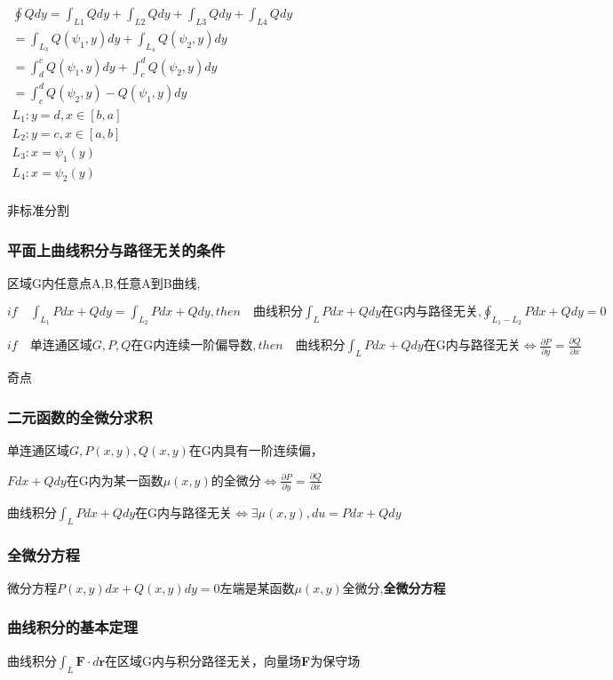 \documentclass[UTF8]{ctexart}
\newcommand{\mt}[1]{\text{#1}}
\newcommand{\mb}[1]{\textbf{#1}}
\newcommand{\mf}[1]{\left( #1\right)}
\newcommand{\mfc}[1]{\left[ #1 \right]}
\newcommand{\q}{\quad}
\newcommand{\p}{\par}
\newcommand{\ma}[1]{\begin{array}{llll} #1 \end{array}}
\newcommand{\da}[2]{\frac{\partial #1}{\partial #2}}
\begin{document}
$\ma{\oint Qdy=\int_{L1}Qdy+\int_{L2}Qdy+\int_{L3}Qdy+\int_{L4}Qdy\\
    =\int_{L_3}Q\mf{\psi_1,y}dy+\int_{L_4}Q\mf{\psi_2,y}dy\\
    =\int_d^cQ\mf{\psi_1,y}dy+\int_c^dQ\mf{\psi_2,y}dy \\
    =\int_c^d Q\mf{\psi_2,y}-Q\mf{\psi_1,y}dy\\
L_1:y= d,x \in \mfc{b,a}\\
L_2:y= c,x \in \mfc{a,b}\\
L_3:x= \psi_1\mf{y}\\
L_4:x= \psi_2\mf{y}\\
}$

非标准分割\p


\subsubsection{平面上曲线积分与路径无关的条件}

区域G内任意点A,B,任意A到B曲线,\p
$if \q \int_{L_1}Pdx+Qdy=\int_{L_2}Pdx+Qdy ,then \q \mt{曲线积分}\int_{L}Pdx+Qdy\mt{在G内与路径无关,}
\oint_{L_1-L_2}Pdx+Qdy=0$


$if \q \mt{单连通区域}G,P,Q\mt{在G内连续一阶偏导数},then \q \mt{曲线积分}\int_{L}Pdx+Qdy\mt{在G内与}\mb{路径无关} \Leftrightarrow \da{P}{y}=\da{Q}{x}$

奇点\p


\subsubsection{二元函数的全微分求积}

单连通区域$G,P\mf{x,y},Q\mf{x,y}$在G内具有一阶连续偏，\p
$F dx+Q dy$在G内为某一函数$\mu\mf{x,y}$的全微分$\Leftrightarrow \da{P}{y}=\da{Q}{x}$\p
曲线积分$\int_LPdx+Qdy$在G内与路径无关$\Leftrightarrow \exists \mu\mf{x,y},du=Pdx+Qdy$\p


\subsubsection*{全微分方程}
微分方程$P\mf{x,y}dx+Q\mf{x,y}dy=0$左端是某函数$\mu{\mf{x,y}}$全微分,\mb{全微分方程}\\


\subsubsection{曲线积分的基本定理}

曲线积分$\int_L\mb{F}\cdot d\mb{r}$在区域G内与积分路径无关，向量场\mb{F}为保守场
\end{document}
